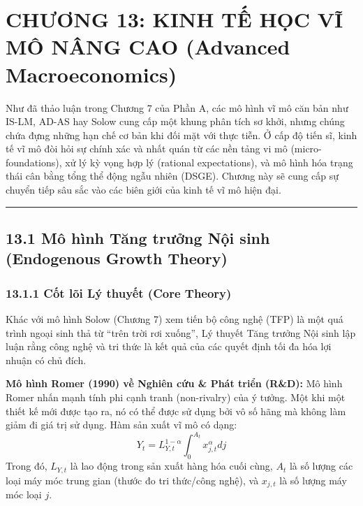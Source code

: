 \documentclass[
]{article}
\begin{document}
\section{CHƯƠNG 13: KINH TẾ HỌC VĨ MÔ NÂNG CAO (Advanced
Macroeconomics)}\label{chux1b0ux1a1ng-13-kinh-tux1ebf-hux1ecdc-vux129-muxf4-nuxe2ng-cao-advanced-macroeconomics}

Như đã thảo luận trong Chương 7 của Phần A, các mô hình vĩ mô căn bản
như IS-LM, AD-AS hay Solow cung cấp một khung phân tích sơ khởi, nhưng
chúng chứa đựng những hạn chế cơ bản khi đối mặt với thực tiễn. Ở cấp độ
tiến sĩ, kinh tế vĩ mô đòi hỏi sự chính xác và nhất quán từ các nền tảng
vi mô (micro-foundations), xử lý kỳ vọng hợp lý (rational expectations),
và mô hình hóa trạng thái cân bằng tổng thể động ngẫu nhiên (DSGE).
Chương này sẽ cung cấp sự chuyển tiếp sâu sắc vào các biên giới của kinh
tế vĩ mô hiện đại.

\begin{center}\rule{0.5\linewidth}{0.5pt}\end{center}

\subsection{13.1 Mô hình Tăng trưởng Nội sinh (Endogenous Growth
Theory)}\label{muxf4-huxecnh-tux103ng-trux1b0ux1edfng-nux1ed9i-sinh-endogenous-growth-theory}

\subsubsection{13.1.1 Cốt lõi Lý thuyết (Core
Theory)}\label{cux1ed1t-luxf5i-luxfd-thuyux1ebft-core-theory-39}

Khác với mô hình Solow (Chương 7) xem tiến bộ công nghệ (TFP) là một quá
trình ngoại sinh thả từ ``trên trời rơi xuống'', Lý thuyết Tăng trưởng
Nội sinh lập luận rằng công nghệ và tri thức là kết quả của các quyết
định tối đa hóa lợi nhuận có chủ đích.

\textbf{Mô hình Romer (1990) về Nghiên cứu \& Phát triển (R\&D):} Mô
hình Romer nhấn mạnh tính phi cạnh tranh (non-rivalry) của ý tưởng. Một
khi một thiết kế mới được tạo ra, nó có thể được sử dụng bởi vô số hãng
mà không làm giảm đi giá trị sử dụng. Hàm sản xuất vĩ mô có dạng:
\[ Y_t = L_{Y,t}^{1-\alpha} \int_0^{A_t} x_{j,t}^\alpha dj \] Trong đó,
\(L_{Y,t}\) là lao động trong sản xuất hàng hóa cuối cùng, \(A_t\) là số
lượng các loại máy móc trung gian (thước đo tri thức/công nghệ), và
\(x_{j,t}\) là số lượng máy móc loại \(j\).
\end{document}
